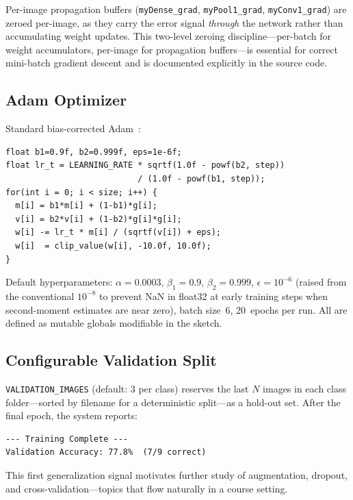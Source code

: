 \documentclass[12pt]{article}
\begin{document}
Per-image propagation buffers (\texttt{myDense\_grad}, \texttt{myPool1\_grad},
\texttt{myConv1\_grad}) are zeroed per-image, as they carry the error signal
\emph{through} the network rather than accumulating weight updates.
This two-level zeroing discipline---per-batch for weight accumulators,
per-image for propagation buffers---is essential for correct mini-batch
gradient descent and is documented explicitly in the source code.

\subsection{Adam Optimizer}
\label{subsec:adam}

Standard bias-corrected Adam~\cite{kingma2015adam}:

\begin{lstlisting}[caption={Adam update (Part~2).}]
float b1=0.9f, b2=0.999f, eps=1e-6f;
float lr_t = LEARNING_RATE * sqrtf(1.0f - powf(b2, step))
                           / (1.0f - powf(b1, step));
for(int i = 0; i < size; i++) {
  m[i] = b1*m[i] + (1-b1)*g[i];
  v[i] = b2*v[i] + (1-b2)*g[i]*g[i];
  w[i] -= lr_t * m[i] / (sqrtf(v[i]) + eps);
  w[i]  = clip_value(w[i], -10.0f, 10.0f);
}
\end{lstlisting}

Default hyperparameters: $\alpha=0.0003$, $\beta_1=0.9$, $\beta_2=0.999$,
$\epsilon=10^{-6}$ (raised from the conventional $10^{-8}$ to prevent NaN
in float32 at early training steps when second-moment estimates are near
zero), batch size~6, 20~epochs per run.
All are defined as mutable globals modifiable in the sketch.

\subsection{Configurable Validation Split}
\label{subsec:validation}

\texttt{VALIDATION\_IMAGES} (default: 3 per class) reserves the last $N$ images
in each class folder---sorted by filename for a deterministic split---as a
hold-out set.
After the final epoch, the system reports:

\begin{lstlisting}[language={}, caption={Post-training validation output.}]
--- Training Complete ---
Validation Accuracy: 77.8%  (7/9 correct)
\end{lstlisting}

This first generalization signal motivates further study of augmentation,
dropout, and cross-validation---topics that flow naturally in a course setting.
\end{document}
